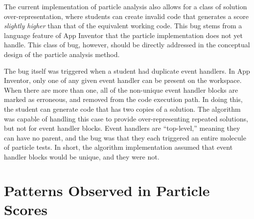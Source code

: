 The current implementation of particle analysis also allows for a class of solution over-representation, where students can create invalid code that generates a score \emph{slightly higher} than that of the equivalent working code. This bug stems from a language feature of App Inventor that the particle implementation does not yet handle. This class of bug, however, should be directly addressed in the conceptual design of the particle analysis method.

The bug itself was triggered when a student had duplicate event handlers. In App Inventor, only one of any given event handler can be present on the workspace. When there are more than one, all of the non-unique event handler blocks are marked as erroneous, and removed from the code execution path. In doing this, the student can generate code that has two copies of a solution. The algorithm was capable of handling this case to provide over-representing repeated solutions, but not for event handler blocks. Event handlers are ``top-level,'' meaning they can have no parent, and the bug was that they each triggered an entire molecule of particle tests. In short, the algorithm implementation assumed that event handler blocks would be unique, and they were not.


\section{Patterns Observed in Particle Scores}
\label{sec:patterns}

